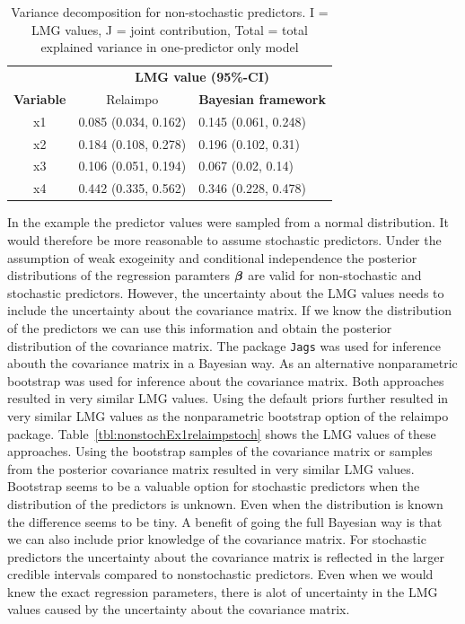 \documentclass[11pt,a4paper,twoside]{book}\usepackage[]{graphicx}\usepackage[]{color}
\begin{document}
\begin{table}[h]
\caption{Variance decomposition for non-stochastic predictors. I = LMG values, J = joint contribution, Total = total explained variance in one-predictor only model}
\centering
\begin{tabular}{cll}
   \toprule
   &\multicolumn{2}{c}{\textbf{LMG value (95\%-CI)}} \\
 \textbf{Variable} & \multicolumn{1}{c}{Relaimpo} & \textbf{Bayesian framework}  \\
  \hline
x1 & 0.085 (0.034, 0.162)  & 0.145 (0.061, 0.248)  \\ 
x2 & 0.184 (0.108, 0.278)  & 0.196 (0.102, 0.31)   \\ 
x3 & 0.106 (0.051, 0.194)  & 0.067 (0.02, 0.14)  \\ 
x4 & 0.442 (0.335, 0.562) & 0.346 (0.228, 0.478)  \\ 
   \bottomrule
\end{tabular}
\label{tbl:nonstochEx1relamip}
\end{table}

\FloatBarrier


In the example the predictor values were sampled from a normal distribution. It would therefore be more reasonable to assume stochastic predictors. Under the assumption of weak exogeinity and conditional independence the posterior distributions of the regression paramters ${\boldsymbol{\beta}}$ are valid for non-stochastic and stochastic predictors. However, the uncertainty about the LMG values needs to include the uncertainty about the covariance matrix. If we know the distribution of the predictors we can use this information and obtain the posterior distribution of the covariance matrix. The package \texttt{Jags} was used for inference abouth the covariance matrix in a Bayesian way. As an alternative nonparametric bootstrap was used for inference about the covariance matrix. Both approaches resulted in very similar LMG values. Using the default priors further resulted in very similar LMG values as the nonparametric bootstrap option of the relaimpo package. Table~\ref{tbl:nonstochEx1relaimpstoch} shows the LMG values of these approaches. Using the bootstrap samples of the covariance matrix or samples from the posterior covariance matrix resulted in very similar LMG values. Bootstrap seems to be a valuable option for stochastic predictors when the distribution of the predictors is unknown. Even when the distribution is known the difference seems to be tiny. A benefit of going the full Bayesian way is that we can also include prior knowledge of the covariance matrix. For stochastic predictors the uncertainty about the covariance matrix is reflected in the larger credible intervals compared to nonstochastic predictors. Even when we would knew the exact regression parameters, there is alot of uncertainty in the LMG values caused by the uncertainty about the covariance matrix. 
\end{document}
